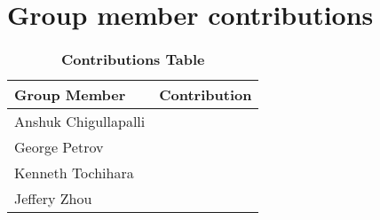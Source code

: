 \section{Group member contributions}
    \begin{table}[H]
        \begin{center}
        \caption{\textbf{Contributions Table}}
        \begin{tabular}{ | p{2in} | p{4in}| } 
            \hline
            \textbf{Group Member} & \textbf{Contribution} \\  \hline
            Anshuk Chigullapalli & \\ \hline
            George Petrov & \\ \hline
            Kenneth Tochihara & \\ \hline
            Jeffery Zhou & \\ \hline
        \end{tabular}
        \end{center}
    \end{table}

